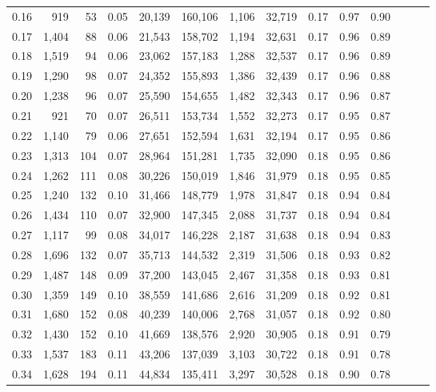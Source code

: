 \begin{tabular}{rrrrrrrrrrrrrr}
0.16 &    919 &     53 &  0.05 &   20,139 &  160,106 &   1,106 &  32,719 &  0.17 &  0.97 &      0.90 \\
0.17 &  1,404 &     88 &  0.06 &   21,543 &  158,702 &   1,194 &  32,631 &  0.17 &  0.96 &      0.89 \\
0.18 &  1,519 &     94 &  0.06 &   23,062 &  157,183 &   1,288 &  32,537 &  0.17 &  0.96 &      0.89 \\
0.19 &  1,290 &     98 &  0.07 &   24,352 &  155,893 &   1,386 &  32,439 &  0.17 &  0.96 &      0.88 \\
0.20 &  1,238 &     96 &  0.07 &   25,590 &  154,655 &   1,482 &  32,343 &  0.17 &  0.96 &      0.87 \\
0.21 &    921 &     70 &  0.07 &   26,511 &  153,734 &   1,552 &  32,273 &  0.17 &  0.95 &      0.87 \\
0.22 &  1,140 &     79 &  0.06 &   27,651 &  152,594 &   1,631 &  32,194 &  0.17 &  0.95 &      0.86 \\
0.23 &  1,313 &    104 &  0.07 &   28,964 &  151,281 &   1,735 &  32,090 &  0.18 &  0.95 &      0.86 \\
0.24 &  1,262 &    111 &  0.08 &   30,226 &  150,019 &   1,846 &  31,979 &  0.18 &  0.95 &      0.85 \\
0.25 &  1,240 &    132 &  0.10 &   31,466 &  148,779 &   1,978 &  31,847 &  0.18 &  0.94 &      0.84 \\
0.26 &  1,434 &    110 &  0.07 &   32,900 &  147,345 &   2,088 &  31,737 &  0.18 &  0.94 &      0.84 \\
0.27 &  1,117 &     99 &  0.08 &   34,017 &  146,228 &   2,187 &  31,638 &  0.18 &  0.94 &      0.83 \\
0.28 &  1,696 &    132 &  0.07 &   35,713 &  144,532 &   2,319 &  31,506 &  0.18 &  0.93 &      0.82 \\
0.29 &  1,487 &    148 &  0.09 &   37,200 &  143,045 &   2,467 &  31,358 &  0.18 &  0.93 &      0.81 \\
0.30 &  1,359 &    149 &  0.10 &   38,559 &  141,686 &   2,616 &  31,209 &  0.18 &  0.92 &      0.81 \\
0.31 &  1,680 &    152 &  0.08 &   40,239 &  140,006 &   2,768 &  31,057 &  0.18 &  0.92 &      0.80 \\
0.32 &  1,430 &    152 &  0.10 &   41,669 &  138,576 &   2,920 &  30,905 &  0.18 &  0.91 &      0.79 \\
0.33 &  1,537 &    183 &  0.11 &   43,206 &  137,039 &   3,103 &  30,722 &  0.18 &  0.91 &      0.78 \\
0.34 &  1,628 &    194 &  0.11 &   44,834 &  135,411 &   3,297 &  30,528 &  0.18 &  0.90 &      0.78 \\

\end{tabular}
